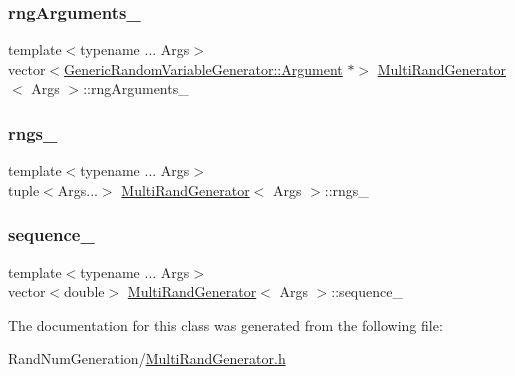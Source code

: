 \subsubsection{\texorpdfstring{rng\+Arguments\+\_\+}{rngArguments\_}}
{\footnotesize\ttfamily template$<$typename ... Args$>$ \\
vector$<$\hyperlink{class_generic_random_variable_generator_1_1_argument}{Generic\+Random\+Variable\+Generator\+::\+Argument} $\ast$$>$ \hyperlink{class_multi_rand_generator}{Multi\+Rand\+Generator}$<$ Args $>$\+::rng\+Arguments\+\_\+\hspace{0.3cm}{\ttfamily [private]}}

\hypertarget{class_multi_rand_generator_a531c3ee630241e7c43b0e3fce70850b1}{}\label{class_multi_rand_generator_a531c3ee630241e7c43b0e3fce70850b1} 
\subsubsection{\texorpdfstring{rngs\+\_\+}{rngs\_}}
{\footnotesize\ttfamily template$<$typename ... Args$>$ \\
tuple$<$Args...$>$ \hyperlink{class_multi_rand_generator}{Multi\+Rand\+Generator}$<$ Args $>$\+::rngs\+\_\+\hspace{0.3cm}{\ttfamily [private]}}

\hypertarget{class_multi_rand_generator_a9a4e23b864633276d73890b770736edd}{}\label{class_multi_rand_generator_a9a4e23b864633276d73890b770736edd} 
\subsubsection{\texorpdfstring{sequence\+\_\+}{sequence\_}}
{\footnotesize\ttfamily template$<$typename ... Args$>$ \\
vector$<$double$>$ \hyperlink{class_multi_rand_generator}{Multi\+Rand\+Generator}$<$ Args $>$\+::sequence\+\_\+\hspace{0.3cm}{\ttfamily [private]}}



The documentation for this class was generated from the following file\+:\begin{DoxyCompactItemize}
\item 
Rand\+Num\+Generation/\hyperlink{_multi_rand_generator_8h}{Multi\+Rand\+Generator.\+h}\end{DoxyCompactItemize}
